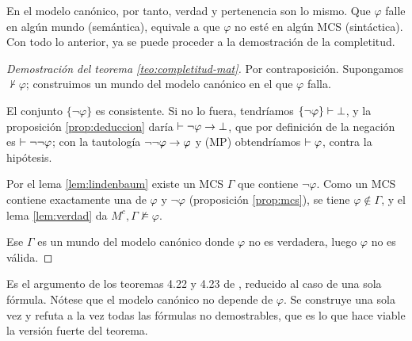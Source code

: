 En el modelo canónico, por tanto, verdad y pertenencia son lo mismo. Que $\varphi$ falle en algún mundo (semántica), equivale a que $\varphi$ no esté en algún MCS (sintáctica). Con todo lo anterior, ya se puede proceder a la demostración de la completitud.

\begin{proof}[Demostración del teorema \ref{teo:completitud-mat}]
Por contraposición. Supongamos $\nvdash \varphi$; construimos un mundo del modelo canónico en el que $\varphi$ falla.

El conjunto $\{\lnot\varphi\}$ es consistente. Si no lo fuera, tendríamos $\{\lnot\varphi\} \vdash \bot$, y la proposición \ref{prop:deduccion} daría $\vdash \lnot\varphi \to \bot$, que por definición de la negación es $\vdash \lnot\lnot\varphi$; con la tautología $\lnot\lnot\varphi \to \varphi$ y (MP) obtendríamos $\vdash \varphi$, contra la hipótesis.

Por el lema \ref{lem:lindenbaum} existe un MCS $\Gamma$ que contiene $\lnot\varphi$. Como un MCS contiene exactamente una de $\varphi$ y $\lnot\varphi$ (proposición \ref{prop:mcs}), se tiene $\varphi \notin \Gamma$, y el lema \ref{lem:verdad} da $M^c, \Gamma \nvDash \varphi$.

Ese $\Gamma$ es un mundo del modelo canónico donde $\varphi$ no es verdadera, luego $\varphi$ no es válida.
\end{proof}

Es el argumento de los teoremas 4.22 y 4.23 de \cite{blackburn}, reducido al caso de una sola fórmula. Nótese que el modelo canónico no depende de $\varphi$. Se construye una sola vez y refuta a la vez todas las fórmulas no demostrables, que es lo que hace viable la versión fuerte del teorema.
